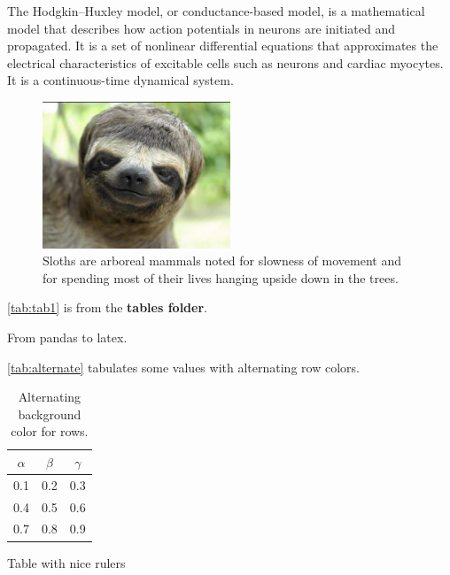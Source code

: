 The Hodgkin–Huxley model, or conductance-based model, is a mathematical model that describes how action potentials in neurons are initiated and propagated. It is a set of nonlinear differential equations that approximates the electrical characteristics of excitable cells such as neurons and cardiac myocytes. It is a continuous-time dynamical system.

\begin{figure}[H]
\centering
\includegraphics[width=0.5\textwidth]{./3_Images/Funny-Animal-Face} 
\caption{Sloths are arboreal mammals noted for slowness of movement and for spending most of their lives hanging upside down in the trees.}
\label{fig:happy2}
\end{figure}




\autoref{tab:tab1} is from the \textbf{tables folder}. 
\begin{table}[H]
\caption{From pandas to latex.}
\centering
{}

\label{tab:tab1}
\end{table}

\autoref{tab:alternate} tabulates some values with alternating row colors.
\begin{table}[H]
\caption{Alternating background color for rows.}
\centering
{}
\begin{tabular}{ccc}
\hline
\hline 
$\alpha$ & $\beta$ & $\gamma$
\\
\hline 
\hline 
0.1 & 0.2 & 0.3
\\
0.4 & 0.5 & 0.6
\\
0.7 & 0.8 & 0.9
\\
\hline
\hline 
\end{tabular}
\label{tab:alternate}
\end{table} 

Table with nice rulers 

